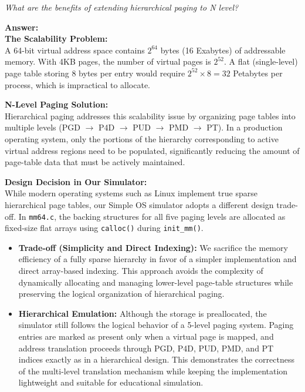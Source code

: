 \begin{questionbox}[Question 5]
\textit{What are the benefits of extending hierarchical paging to N level?}
\end{questionbox}

\textbf{Answer:}\\
\noindent\textbf{The Scalability Problem:} \\
A 64-bit virtual address space contains $2^{64}$ bytes (16 Exabytes) of addressable memory. With 4KB pages, the number of virtual pages is $2^{52}$. A flat (single-level) page table storing 8 bytes per entry would require $2^{52} \times 8 = 32$ Petabytes per process, which is impractical to allocate.

\vspace{0.8em}
\noindent\textbf{N-Level Paging Solution:} \\
Hierarchical paging addresses this scalability issue by organizing page tables into multiple levels (PGD $\to$ P4D $\to$ PUD $\to$ PMD $\to$ PT). In a production operating system, only the portions of the hierarchy corresponding to active virtual address regions need to be populated, significantly reducing the amount of page-table data that must be actively maintained.

\vspace{0.8em}
\noindent\textbf{Design Decision in Our Simulator:} \\
While modern operating systems such as Linux implement true sparse hierarchical page tables, our Simple OS simulator adopts a different design trade-off. In \texttt{mm64.c}, the backing structures for all five paging levels are allocated as fixed-size flat arrays using \texttt{calloc()} during \texttt{init\_mm()}.

\begin{itemize}
    \item \textbf{Trade-off (Simplicity and Direct Indexing):} We sacrifice the memory efficiency of a fully sparse hierarchy in favor of a simpler implementation and direct array-based indexing. This approach avoids the complexity of dynamically allocating and managing lower-level page-table structures while preserving the logical organization of hierarchical paging.
    
    \item \textbf{Hierarchical Emulation:} Although the storage is preallocated, the simulator still follows the logical behavior of a 5-level paging system. Paging entries are marked as present only when a virtual page is mapped, and address translation proceeds through PGD, P4D, PUD, PMD, and PT indices exactly as in a hierarchical design. This demonstrates the correctness of the multi-level translation mechanism while keeping the implementation lightweight and suitable for educational simulation.
\end{itemize}

